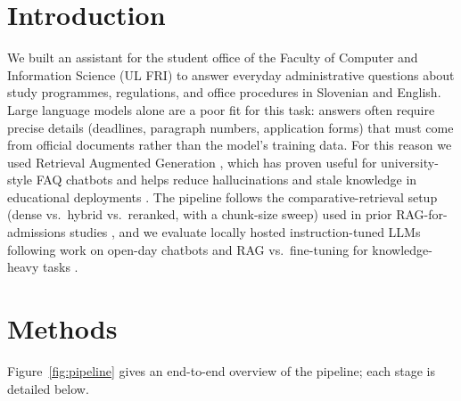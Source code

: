 \documentclass[fleqn,moreauthors,10pt]{ds_report}
\begin{document}
\flushbottom 

\maketitle 

\thispagestyle{empty} 


\section*{Introduction}
We built an assistant for the student office of the Faculty of Computer and Information Science (UL FRI) to answer everyday administrative questions about study programmes, regulations, and office procedures in Slovenian and English. Large language models alone are a poor fit for this task: answers often require precise details (deadlines, paragraph numbers, application forms) that must come from official documents rather than the model's training data. For this reason we used Retrieval Augmented Generation \cite{lewis2020retrieval}, which has proven useful for university-style FAQ chatbots \cite{ranoliya2017chatbot,adamopoulou2020overview} and helps reduce hallucinations and stale knowledge in educational deployments \cite{SurveyRAGeducation}. The pipeline follows the comparative-retrieval setup (dense vs.\ hybrid vs.\ reranked, with a chunk-size sweep) used in prior RAG-for-admissions studies \cite{llmStudentAdmissions,mississippiUniversity2024}, and we evaluate locally hosted instruction-tuned LLMs following work on open-day chatbots and RAG vs.\ fine-tuning for knowledge-heavy tasks \cite{universityOpenDaysLocalLLMs,ovadia2024finetuningretrievalcomparingknowledge}.


\section*{Methods}

Figure~\ref{fig:pipeline} gives an end-to-end overview of the pipeline; each stage is detailed below.
\end{document}

